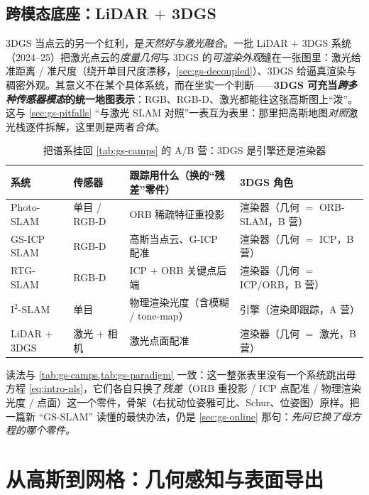 \subsection{跨模态底座：LiDAR \texorpdfstring{$+$}{+} 3DGS}

3DGS 当点云的另一个红利，是\emph{天然好与激光融合}。一批 LiDAR $+$ 3DGS 系统（2024--25）把激光点云的\emph{度量几何}与 3DGS 的\emph{可渲染外观}缝在一张图里：激光给准距离 / 准尺度（绕开单目尺度漂移，\cref{sec:gs-decoupled}）、3DGS 给逼真渲染与稠密外观。其意义不在某个具体系统，而在坐实一个判断——\textbf{3DGS 可充当\emph{跨多种传感器模态}的统一地图表示}：RGB、RGB-D、激光都能往这张高斯图上“泼”。这与 \cref{sec:gs-pitfalls} “与激光 SLAM 对照”一表互为表里：那里把高斯地图\emph{对照}激光栈逐件拆解，这里则是两者\emph{合体}。

\begin{table}[H]\centering
\caption{把谱系挂回 \cref{tab:gs-camps} 的 A/B 营：3DGS 是引擎还是渲染器}
\label{tab:gs-gallery}
\small
\begin{tabular}{@{}llll@{}}
\toprule
系统 & 传感器 & 跟踪用什么（换的“残差”零件）& 3DGS 角色 \\
\midrule
Photo-SLAM & 单目 / RGB-D & ORB 稀疏特征重投影 & 渲染器（几何 $=$ ORB-SLAM，B 营）\\
GS-ICP SLAM & RGB-D & 高斯当点云、G-ICP 配准 & 渲染器（几何 $=$ ICP，B 营）\\
RTG-SLAM & RGB-D & ICP $+$ ORB 关键点后端 & 渲染器（几何 $=$ ICP/ORB，B 营）\\
I$^2$-SLAM & 单目 & 物理渲染光度（含模糊 / tone-map）& 引擎（渲染即跟踪，A 营）\\
LiDAR $+$ 3DGS & 激光 $+$ 相机 & 激光点面配准 & 渲染器（几何 $=$ 激光，B 营）\\
\bottomrule
\end{tabular}
\end{table}

\noindent{}读法与 \cref{tab:gs-camps,tab:gs-paradigm} 一致：这一整张表里没有一个系统跳出母方程 \cref{eq:intro-nls}，它们各自只换了\emph{残差}（ORB 重投影 / ICP 点配准 / 物理渲染光度 / 点面）这一个零件，骨架（右扰动位姿雅可比、Schur、位姿图）原样。把一篇新 “GS-SLAM” 读懂的最快办法，仍是 \cref{sec:gs-online} 那句：\emph{先问它换了母方程的哪个零件。}

\section{从高斯到网格：几何感知与表面导出}
\label{sec:gs-geom}

